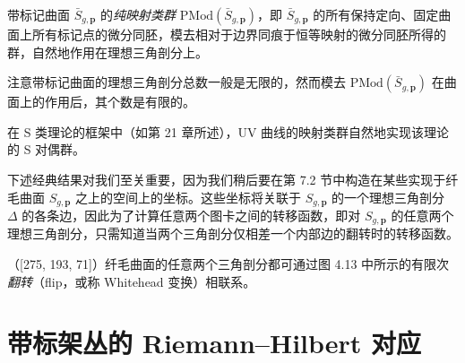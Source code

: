 
\begin{definition}[4.17]
带标记曲面 $\bar S_{g,\mathbf p}$ 的\emph{纯映射类群} $\mathrm{PMod}(\bar S_{g,\mathbf p})$，即 $\bar S_{g,\mathbf p}$ 的所有保持定向、固定曲面上所有标记点的微分同胚，模去相对于边界同痕于恒等映射的微分同胚所得的群，自然地作用在理想三角剖分上。
\end{definition}

\begin{remark}[4.18]
注意带标记曲面的理想三角剖分总数一般是无限的，然而模去 $\mathrm{PMod}(\bar S_{g,\mathbf p})$ 在曲面上的作用后，其个数是有限的。
\end{remark}

\begin{remark}[4.19]
在 S 类理论的框架中（如第 21 章所述），UV 曲线的映射类群自然地实现该理论的 S 对偶群。
\end{remark}

下述经典结果对我们至关重要，因为我们稍后要在第 7.2 节中构造在某些实现于纤毛曲面 $S_{g,\mathbf p}$ 之上的空间上的坐标。这些坐标将关联于 $S_{g,\mathbf p}$ 的一个理想三角剖分 $\Delta$ 的各条边，因此为了计算任意两个图卡之间的转移函数，即对 $S_{g,\mathbf p}$ 的任意两个理想三角剖分，只需知道当两个三角剖分仅相差一个内部边的翻转时的转移函数。

\begin{theorem}[4.20]
（[275, 193, 71]）\quad 纤毛曲面的任意两个三角剖分都可通过图 4.13 中所示的有限次\emph{翻转}（flip，或称 Whitehead 变换）相联系。
\end{theorem}


\section{带标架丛的 Riemann--Hilbert 对应}

